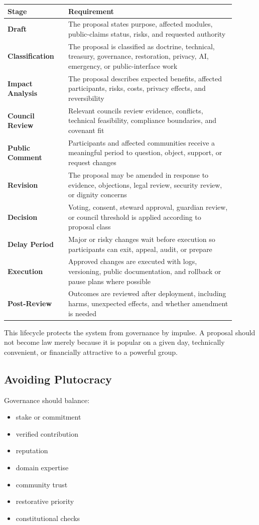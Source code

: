 \documentclass[12pt]{article}
\begin{document}
\begin{longtable}{>{\bfseries}p{0.24\linewidth}p{0.66\linewidth}}
\toprule
Stage & Requirement \\
\midrule
Draft & The proposal states purpose, affected modules, public-claims status, risks, and requested authority \\
Classification & The proposal is classified as doctrine, technical, treasury, governance, restoration, privacy, AI, emergency, or public-interface work \\
Impact Analysis & The proposal describes expected benefits, affected participants, risks, costs, privacy effects, and reversibility \\
Council Review & Relevant councils review evidence, conflicts, technical feasibility, compliance boundaries, and covenant fit \\
Public Comment & Participants and affected communities receive a meaningful period to question, object, support, or request changes \\
Revision & The proposal may be amended in response to evidence, objections, legal review, security review, or dignity concerns \\
Decision & Voting, consent, steward approval, guardian review, or council threshold is applied according to proposal class \\
Delay Period & Major or risky changes wait before execution so participants can exit, appeal, audit, or prepare \\
Execution & Approved changes are executed with logs, versioning, public documentation, and rollback or pause plans where possible \\
Post-Review & Outcomes are reviewed after deployment, including harms, unexpected effects, and whether amendment is needed \\
\bottomrule
\end{longtable}

This lifecycle protects the system from governance by impulse. A proposal should not become law merely because it is popular on a given day, technically convenient, or financially attractive to a powerful group.

\subsection{Avoiding Plutocracy}

Governance should balance:

\begin{itemize}
  \item stake or commitment
  \item verified contribution
  \item reputation
  \item domain expertise
  \item community trust
  \item restorative priority
  \item constitutional checks
\end{itemize}
\end{document}
